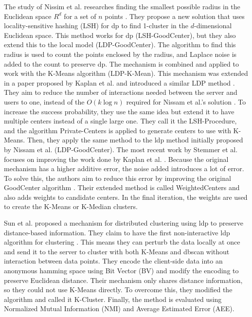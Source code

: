 The study of Nissim et al. researches finding the smallest possible radius in the Euclidean space  $R^d$ for a set of $n$ points \citep{nissim_clustering_2018}.
They propose a new solution that uses locality-sensitive hashing (LSH) for \gls{dp} to find 1-cluster in the $d$-dimensional Euclidean space.
This method works for \gls{dp} (LSH-GoodCenter), but they also extend this to the local model (LDP-GoodCenter).
The algorithm to find this radius is used to count the points enclosed by the radius, and Laplace noise is added to the count to preserve \gls{dp}.
The mechanism is combined and applied to work with the K-Means algorithm (LDP-K-Mean).
This mechanism was extended in a paper proposed by Kaplan et al. and introduced a similar LDP method \citep{kaplan_differentially_2018}.
They aim to reduce the number of interactions needed between the server and users to one, instead of the $O(k\log n)$ required for Nissam et al.’s solution \citep{nissim_clustering_2018}.
To increase the success probability, they use the same idea but extend it to have multiple centers instead of a single large one.
They call it the LSH-Procedure, and the algorithm Private-Centers is applied to generate centers to use with K-Means.
Then, they apply the same method to the \gls{ldp} method initially proposed by Nissam et al. (LDP-GoodCenter).
The most recent work by Stemmer et al. focuses on improving the work done by Kaplan et al. \citep{kaplan_differentially_2018,stemmer_locally_2021}.
Because the original mechanism has a higher additive error, the noise added introduces a lot of error.
To solve this, the authors aim to reduce this error by improving the original GoodCenter algorithm \citep{nissim_clustering_2018}.
Their extended method is called WeightedCenters and also adds weights to candidate centers.
In the final iteration, the weights are used to create the K-Means or K-Median clusters.

Sun et al. proposed a mechanism for distributed clustering using \gls{ldp} to preserve distance-based information.
They claim to have the first non-interactive \gls{ldp} algorithm for clustering \citep{su_differentially_2015}.
This means they can perturb the data locally at once and send it to the server to cluster with both K-Means and \gls{dbscan} without interaction between data points.
They encode the client-side data into an anonymous hamming space using Bit Vector (BV) and modify the encoding to preserve Euclidean distance.
Their mechanism only shares distance information, so they could not use K-Means directly.
To overcome this, they modified the algorithm and called it K-Cluster.
Finally, the method is evaluated using Normalized Mutual Information (NMI) and Average Estimated Error (AEE).

